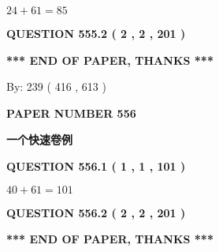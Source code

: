 \documentclass{ctexart}
\begin{document}
  
 
 

$ %
24 +  %
61=   %
85$
 
 
  
\vspace{0.2in}
  
{\textbf{\Large{QUESTION
555.2 
 ( 2 , 2 , 201 )
}}}
  
  
   
   
 \vspace{0.2in}
 
   
   
   
   
\vspace{1.0in} 
{\textbf{\large{ *** END OF PAPER, THANKS *** }}} 
   
   
\hspace{1.0in} By: 
 239 ( 416 ,  613 )
   
   
   
   
\newpage 
\setcounter{page}{ 
   556001 } 
   
   
   
   
 {\textbf{ \Large{ PAPER NUMBER  556  }}}
   
   
\vspace{0.2in}
   
   
   
   
   
   
 \vspace{0.2in}
{\LARGE {\textbf{ 一个快速卷例}}}
   
   
  
\vspace{0.2in}
  
{\textbf{\Large{QUESTION
556.1 
 ( 1 , 1 , 101 )
}}}
  
  
 
 

$ %
40 +  %
61=   %
101$
 
 
  
\vspace{0.2in}
  
{\textbf{\Large{QUESTION
556.2 
 ( 2 , 2 , 201 )
}}}
  
  
   
   
 \vspace{0.2in}
 
   
   
   
   
\vspace{1.0in} 
{\textbf{\large{ *** END OF PAPER, THANKS *** }}} 
   
\end{document}
